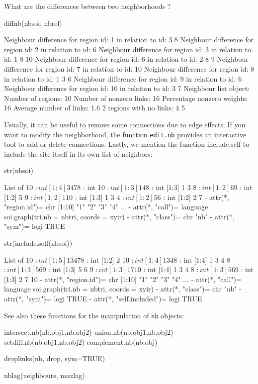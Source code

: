 \documentclass[a4paper]{article}
\begin{document}
What are the differences between two neighborhoods ?
\begin{Schunk}
\begin{Sinput}
 diffnb(nbsoi, nbrel)
\end{Sinput}
\begin{Soutput}
Neighbour difference for region id: 1 in relation to id: 3 8 
Neighbour difference for region id: 2 in relation to id: 6 
Neighbour difference for region id: 3 in relation to id: 1 8 10 
Neighbour difference for region id: 6 in relation to id: 2 8 9 
Neighbour difference for region id: 7 in relation to id: 10 
Neighbour difference for region id: 8 in relation to id: 1 3 6 
Neighbour difference for region id: 9 in relation to id: 6 
Neighbour difference for region id: 10 in relation to id: 3 7 
Neighbour list object:
Number of regions: 10 
Number of nonzero links: 16 
Percentage nonzero weights: 16 
Average number of links: 1.6 
2 regions with no links:
4 5
\end{Soutput}
\end{Schunk}

Usually, it can be useful to remove some connections due to edge effects. If you want to modify the neighborhood, the function \texttt{edit.nb} provides an interactive tool to add or delete connections.
Lastly, we mention the function include.self to include the site itself in its own list of neighbors:
\begin{Schunk}
\begin{Sinput}
 str(nbsoi)
\end{Sinput}
\begin{Soutput}
List of 10
 $ : int [1:4] 3 4 7 8
 $ : int 10
 $ : int [1:3] 1 4 8
 $ : int [1:3] 1 3 8
 $ : int [1:2] 6 9
 $ : int [1:2] 5 9
 $ : int [1:2] 1 10
 $ : int [1:3] 1 3 4
 $ : int [1:2] 5 6
 $ : int [1:2] 2 7
 - attr(*, "region.id")= chr [1:10] "1" "2" "3" "4" ...
 - attr(*, "call")= language soi.graph(tri.nb = nbtri, coords = xyir)
 - attr(*, "class")= chr "nb"
 - attr(*, "sym")= logi TRUE
\end{Soutput}
\begin{Sinput}
 str(include.self(nbsoi))
\end{Sinput}
\begin{Soutput}
List of 10
 $ : int [1:5] 1 3 4 7 8
 $ : int [1:2] 2 10
 $ : int [1:4] 1 3 4 8
 $ : int [1:4] 1 3 4 8
 $ : int [1:3] 5 6 9
 $ : int [1:3] 5 6 9
 $ : int [1:3] 1 7 10
 $ : int [1:4] 1 3 4 8
 $ : int [1:3] 5 6 9
 $ : int [1:3] 2 7 10
 - attr(*, "region.id")= chr [1:10] "1" "2" "3" "4" ...
 - attr(*, "call")= language soi.graph(tri.nb = nbtri, coords = xyir)
 - attr(*, "class")= chr "nb"
 - attr(*, "sym")= logi TRUE
 - attr(*, "self.included")= logi TRUE
\end{Soutput}
\end{Schunk}
See also these functions for the manipulation of \texttt{nb} objects:
\begin{Sinput}
intersect.nb(nb.obj1,nb.obj2)
union.nb(nb.obj1,nb.obj2)
setdiff.nb(nb.obj1,nb.obj2)
complement.nb(nb.obj)

droplinks(nb, drop, sym=TRUE)

nblag(neighbours, maxlag)
\end{Sinput}
\end{document}
